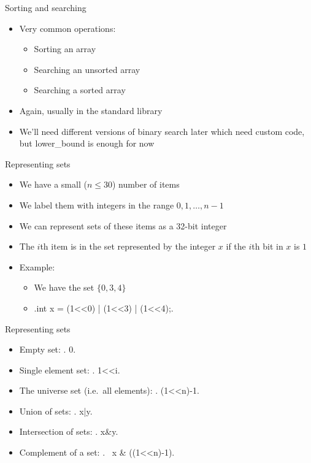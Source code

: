 \documentclass[10pt]{beamer}
\newcommand{\bi}{\begin{itemize}}
\newcommand{\ei}{\end{itemize}}
\begin{document}
\begin{frame}{Sorting and searching}
    \vspace{30pt}

    \bi
        \item Very common operations:
            \bi
                \item Sorting an array 
                \item Searching an unsorted array 
                \item Searching a sorted array 
            \ei

        \item Again, usually in the standard library
        \item We'll need different versions of binary search later which need custom code, but \alert{lower\_{}bound} is enough for now
    \ei
\end{frame}

\begin{frame}[fragile]{Representing sets}
    \vspace{30pt}
    \bi
        \item We have a small ($n\leq 30$) number of items
        \item We label them with integers in the range $0,1,\ldots,n-1$
        \item We can represent sets of these items as a 32-bit integer
        \item The $i$th item is in the set represented by the integer $x$ if the $i$th bit in $x$ is $1$
        \item Example:
            \bi
                \item We have the set $\{0,3,4\}$
                \item {}.int x = (1<<0) | (1<<3) | (1<<4);.
            \ei
    \ei
\end{frame}



\begin{frame}[fragile]{Representing sets}
    \vspace{5pt}
    \bi
        \item Empty set:
            .   0.
        \item Single element set:
            .   1<<i.
        \item The universe set (i.e.\ all elements):
            .   (1<<n)-1.
        \item Union of sets:
            .   x|y.
        \item Intersection of sets: .   x&y.
        \item Complement of a set: .   ~x & ((1<<n)-1).
    \ei
\end{frame}
\end{document}
